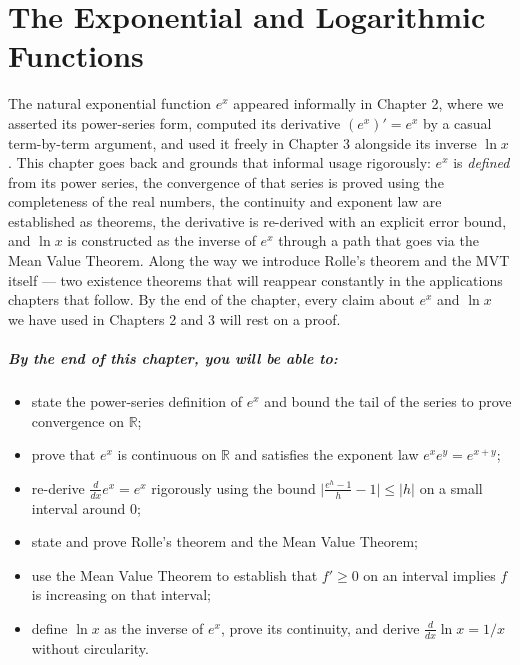 \chapter{The Exponential and Logarithmic Functions}

The natural exponential function \(e^{x}\) appeared informally in Chapter 2, where we asserted its power-series form, computed its derivative \((e^{x})' = e^{x}\) by a casual term-by-term argument, and used it freely in Chapter 3 alongside its inverse \(\ln x\). This chapter goes back and grounds that informal usage rigorously: \(e^{x}\) is \emph{defined} from its power series, the convergence of that series is proved using the completeness of the real numbers, the continuity and exponent law are established as theorems, the derivative is re-derived with an explicit error bound, and \(\ln x\) is constructed as the inverse of \(e^{x}\) through a path that goes via the Mean Value Theorem. Along the way we introduce Rolle's theorem and the MVT itself --- two existence theorems that will reappear constantly in the applications chapters that follow. By the end of the chapter, every claim about \(e^{x}\) and \(\ln x\) we have used in Chapters 2 and 3 will rest on a proof.

\paragraph{By the end of this chapter, you will be able to:}
\begin{itemize}
    \item state the power-series definition of \(e^{x}\) and bound the tail of the series to prove convergence on \(\mathbb{R}\);
    \item prove that \(e^{x}\) is continuous on \(\mathbb{R}\) and satisfies the exponent law \(e^{x} e^{y} = e^{x + y}\);
    \item re-derive \(\frac{d}{dx} e^{x} = e^{x}\) rigorously using the bound \(\bigl\lvert \frac{e^{h} - 1}{h} - 1 \bigr\rvert \leq \lvert h \rvert\) on a small interval around \(0\);
    \item state and prove Rolle's theorem and the Mean Value Theorem;
    \item use the Mean Value Theorem to establish that \(f' \geq 0\) on an interval implies \(f\) is increasing on that interval;
    \item define \(\ln x\) as the inverse of \(e^{x}\), prove its continuity, and derive \(\frac{d}{dx} \ln x = 1/x\) without circularity.
\end{itemize}

